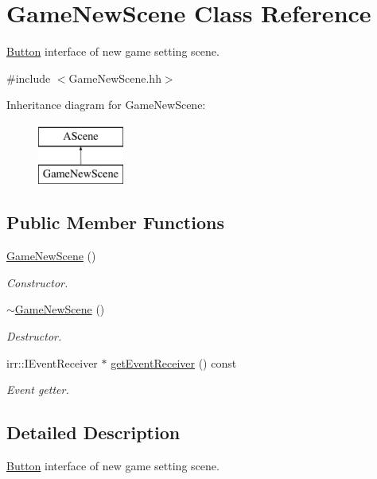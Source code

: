 \hypertarget{classGameNewScene}{}\section{Game\+New\+Scene Class Reference}
\label{classGameNewScene}


\hyperlink{classButton}{Button} interface of new game setting scene.  




{\ttfamily \#include $<$Game\+New\+Scene.\+hh$>$}

Inheritance diagram for Game\+New\+Scene\+:\begin{figure}[H]
\begin{center}
\leavevmode
\includegraphics[height=2.000000cm]{classGameNewScene}
\end{center}
\end{figure}
\subsection*{Public Member Functions}
\begin{DoxyCompactItemize}
\item 
\hyperlink{classGameNewScene_af482b13a2d9e315ef39a6e41293bf4fb}{Game\+New\+Scene} ()
\begin{DoxyCompactList}\small\item\em Constructor. \end{DoxyCompactList}\item 
\hyperlink{classGameNewScene_a3df0ff81012d3f7dbd08c7367be22fdf}{$\sim$\+Game\+New\+Scene} ()
\begin{DoxyCompactList}\small\item\em Destructor. \end{DoxyCompactList}\item 
irr\+::\+I\+Event\+Receiver $\ast$ \hyperlink{classGameNewScene_a21c27ef3ea1923d975683e1bcdd134fa}{get\+Event\+Receiver} () const
\begin{DoxyCompactList}\small\item\em Event getter. \end{DoxyCompactList}\end{DoxyCompactItemize}


\subsection{Detailed Description}
\hyperlink{classButton}{Button} interface of new game setting scene. 

